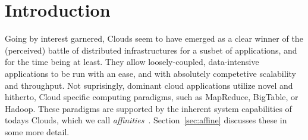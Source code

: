 \documentclass{article}
\newcommand{\I}[1]{\textit{#1}}
\begin{document}

% 
% 
% 
% 
% 
% 
% 
% 
% 


\section{Introduction}

Going by interest garnered, Clouds seem to have emerged as a clear
winner of the (perceived) battle of distributed infrastructures for a
susbet of applications, and for the time being at least.  They allow
loosely-coupled, data-intensive applications to be run with an ease,
and with absolutely competetive scalability and throughput.  Not
suprisingly, dominant cloud applications utilize novel and hitherto,
Cloud specific computing paradigms, such as MapReduce, BigTable, or
Hadoop.  These paradigms are supported by the inherent system
capabilities of todays Clouds, which we call
\I{affinities}~\cite{cloud-saga-paper}.  Section~\ref{sec:affine}
discusses these in some more detail.
\end{document}
